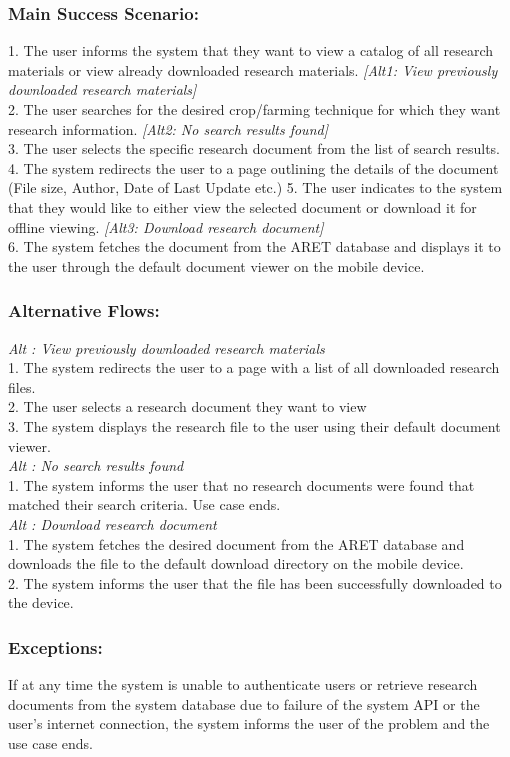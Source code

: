 \documentclass[12pt,letterpaper]{article}
\begin{document}
\subsubsection*{Main Success Scenario:}
1. The user informs the system that they want to view a catalog of all research materials or view already downloaded research materials. \emph{[Alt1: View previously downloaded research materials]}\\
2. The user searches for the desired crop/farming technique for which they want research information. \emph{[Alt2: No search results found]}\\
3. The user selects the specific research document from the list of search results.
4. The system redirects the user to a page outlining the details of the document (File size, Author, Date of Last Update etc.)
5. The user indicates to the system that they would like to either view the selected document or download it for offline viewing. \emph{[Alt3: Download research document]}\\
6. The system fetches the document from the ARET database and displays it to the user through the default document viewer on the mobile device.

\subsubsection*{Alternative Flows:}
\emph{Alt : View previously downloaded research materials}\\
1. The system redirects the user to a page with a list of all downloaded research files.\\
2. The user selects a research document they want to view\\
3. The system displays the research file to the user using their default document viewer.\\[10pt]
\emph{Alt : No search results found}\\
1. The system informs the user that no research documents were found that matched their search criteria. Use case ends. \\[10pt]
\emph{Alt : Download research document}\\
1. The system fetches the desired document from the ARET database and downloads the file to the default download directory on the mobile device.\\
2. The system informs the user that the file has been successfully downloaded to the device.

\subsubsection*{Exceptions:}
If at any time the system is unable to authenticate users or retrieve research documents from the system database due to failure of the system API or the user’s internet connection, the system informs the user of the problem and the use case ends.
\end{document}
